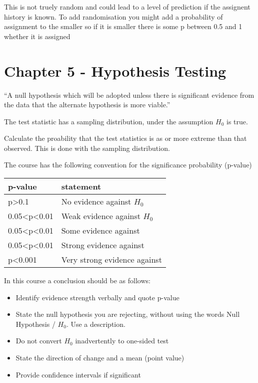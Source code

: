 \documentclass[
  letterpaper,
  DIV=11,
  numbers=noendperiod]{scrreprt}
\providecommand{\tightlist}{%
  \setlength{\itemsep}{0pt}\setlength{\parskip}{0pt}}\usepackage{longtable,booktabs,array}
\begin{document}
This is not truely random and could lead to a level of prediction if the
assignent history is known. To add randomisation you might add a
probability of assignment to the smaller so if it is smaller there is
some p between 0.5 and 1 whether it is assigned


\hypertarget{chapter-5---hypothesis-testing}{%
\chapter{Chapter 5 - Hypothesis
Testing}\label{chapter-5---hypothesis-testing}}

``A null hypothesis which will be adopted unless there is significant
evidence from the data that the alternate hypothesis is more viable.''

The test statistic has a sampling distribution, under the assumption
\(H_0\) is true.

Calculate the proability that the test statistics is as or more extreme
than that observed. This is done with the sampling distribution.

The course has the following convention for the significance probability
(p-value)

\begin{longtable}[]{@{}ll@{}}
\toprule()
p-value & statement \\
\midrule()
\endhead
p\textgreater0.1 & No evidence against \(H_0\) \\
0.05\textless p\textless0.01 & Weak evidence against \(H_0\) \\
0.05\textless p\textless0.01 & Some evidence against \\
0.05\textless p\textless0.01 & Strong evidence against \\
p\textless0.001 & Very strong evidence against \\
\bottomrule()
\end{longtable}

In this course a conclusion should be as follows:

\begin{itemize}
\tightlist
\item
  Identify evidence strength verbally and quote p-value
\item
  State the null hypothesis you are rejecting, without using the words
  Null Hypothesis / \(H_0\). Use a description.
\item
  Do not convert \(H_0\) inadvertently to one-sided test
\item
  State the direction of change and a mean (point value)
\item
  Provide confidence intervals if significant
\end{itemize}
\end{document}
